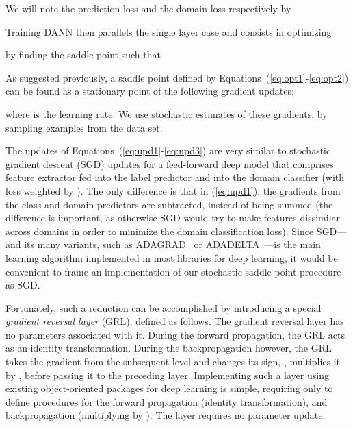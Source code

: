 \documentclass[twoside,11pt]{article}
\newcommand{\eq}[1]{(\ref{eq:#1})}
\begin{document}
We will note the prediction loss and the domain loss respectively by

Training DANN then parallels the single layer case and consists in optimizing

by finding the saddle point  such that











As suggested previously, a saddle point defined by Equations~(\ref{eq:opt1}-\ref{eq:opt2}) can be found as a stationary point of the following gradient updates:
{\allowdisplaybreaks[4]

}where  is the learning rate. We use stochastic estimates of these gradients, by sampling examples from the data set.

The updates of Equations~(\ref{eq:upd1}-\ref{eq:upd3}) are very similar to stochastic gradient descent (SGD) updates for a feed-forward deep model that comprises feature extractor fed into the label predictor and into the domain classifier (with loss weighted by ). The only difference is that in \eq{upd1}, the gradients from the class and domain predictors are subtracted, instead of being summed (the difference is important, as otherwise SGD would try to make features dissimilar across domains in order to minimize the domain classification loss). Since SGD---and its many variants, such as ADAGRAD~\citep{Duchi:EECS-2010-24} or ADADELTA~\citep{Zeiler2012}---is the main learning algorithm implemented in most libraries for deep learning, it would be convenient to frame an implementation of our stochastic saddle point procedure as SGD.

Fortunately, such a reduction can be accomplished by introducing a special \emph{gradient reversal layer} (GRL), defined as follows. The gradient reversal layer has no parameters associated with it.
During the forward propagation, the GRL acts as an identity transformation. During the backpropagation however, the GRL takes the gradient from the subsequent level and changes its sign, \ie,  multiplies it by , before passing it to the preceding layer. Implementing such a layer using existing object-oriented packages for deep learning is simple, requiring only to define procedures for the forward propagation (identity transformation), and backpropagation (multiplying by ). The layer requires no parameter update. 
\end{document}
